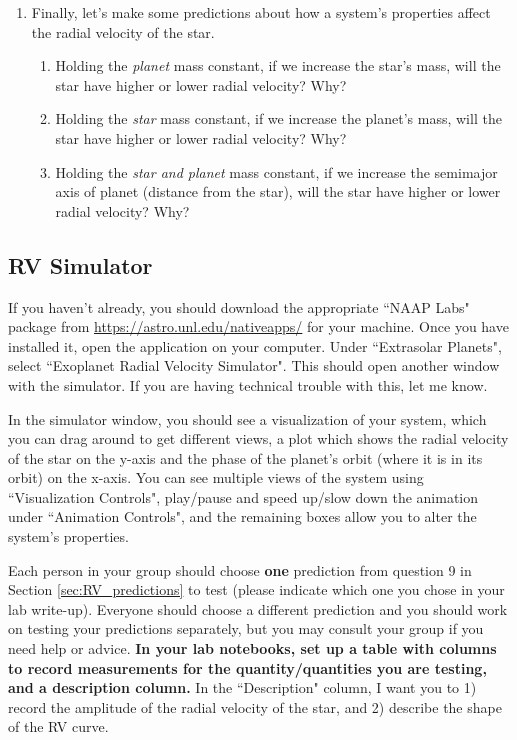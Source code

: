 \documentclass[11pt]{article}
\begin{document}
\begin{enumerate}
    \item Finally, let's make some predictions about how a system's properties affect the radial velocity of the star.
    \begin{enumerate}
        \item Holding the \textit{planet} mass constant, if we increase the star's mass, will the star have higher or lower radial velocity? Why?
        \item Holding the \textit{star} mass constant, if we increase the planet's mass, will the star have higher or lower radial velocity? Why?
        \item Holding the \textit{star and planet} mass constant, if we increase the semimajor axis of planet (distance from the star), will the star have higher or lower radial velocity? Why?
    \end{enumerate}
        
\end{enumerate}

\subsection{RV Simulator}
\noindent
If you haven't already, you should download the appropriate ``NAAP Labs" package from \url{https://astro.unl.edu/nativeapps/} for your machine.  Once you have installed it, open the application on your computer.  Under ``Extrasolar Planets", select ``Exoplanet Radial Velocity Simulator".  This should open another window with the simulator.  If you are having technical trouble with this, let me know.

\medskip \noindent
In the simulator window, you should see a visualization of your system, which you can drag around to get different views, a plot which shows the radial velocity of the star on the y-axis and the phase of the planet's orbit (where it is in its orbit) on the x-axis.  You can see multiple views of the system using ``Visualization Controls", play/pause and speed up/slow down the animation under ``Animation Controls", and the remaining boxes allow you to alter the system's properties.

\medskip \noindent
Each person in your group should choose \textbf{one} prediction from question 9 in Section \ref{sec:RV_predictions} to test (please indicate which one you chose in your lab write-up).  Everyone should choose a different prediction and you should work on testing your predictions separately, but you may consult your group if you need help or advice. \textbf{In your lab notebooks, set up a table with columns to record measurements for the quantity/quantities you are testing, and a description column.}  In the ``Description" column, I want you to 1) record the amplitude of the radial velocity of the star, and 2) describe the shape of the RV curve.
\end{document}
